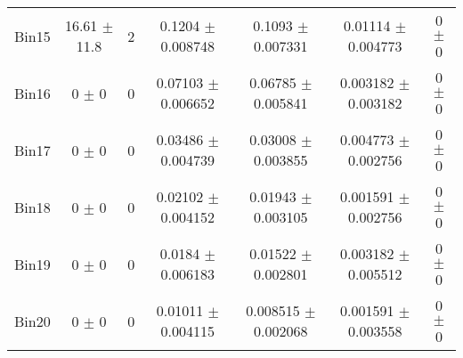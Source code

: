 \begin{tabular}{@{\extracolsep{4pt}}lcccccc@{}}
     Bin15 & 16.61 $\pm$ 11.8 & 2 & 0.1204 $\pm$ 0.008748 & 0.1093 $\pm$ 0.007331 & 0.01114 $\pm$ 0.004773 & 0 $\pm$ 0 \\ 
     Bin16 & 0 $\pm$ 0 & 0 & 0.07103 $\pm$ 0.006652 & 0.06785 $\pm$ 0.005841 & 0.003182 $\pm$ 0.003182 & 0 $\pm$ 0 \\ 
     Bin17 & 0 $\pm$ 0 & 0 & 0.03486 $\pm$ 0.004739 & 0.03008 $\pm$ 0.003855 & 0.004773 $\pm$ 0.002756 & 0 $\pm$ 0 \\ 
     Bin18 & 0 $\pm$ 0 & 0 & 0.02102 $\pm$ 0.004152 & 0.01943 $\pm$ 0.003105 & 0.001591 $\pm$ 0.002756 & 0 $\pm$ 0 \\ 
     Bin19 & 0 $\pm$ 0 & 0 & 0.0184 $\pm$ 0.006183 & 0.01522 $\pm$ 0.002801 & 0.003182 $\pm$ 0.005512 & 0 $\pm$ 0 \\ 
     Bin20 & 0 $\pm$ 0 & 0 & 0.01011 $\pm$ 0.004115 & 0.008515 $\pm$ 0.002068 & 0.001591 $\pm$ 0.003558 & 0 $\pm$ 0 \\ 
\hline\hline
  \end{tabular}
